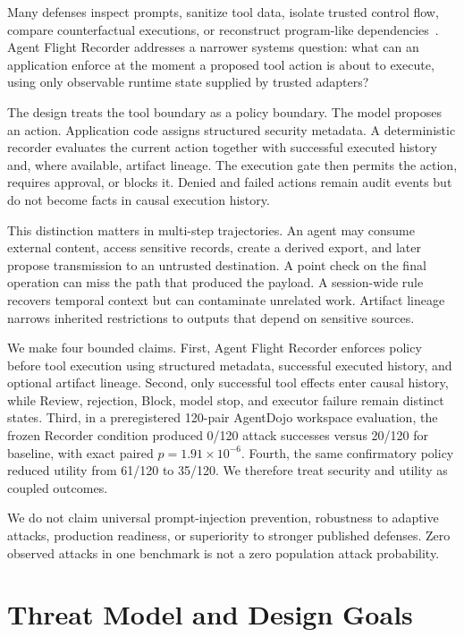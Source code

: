 \documentclass[letterpaper,twocolumn,10pt]{article}
\begin{document}
Many defenses inspect prompts, sanitize tool data, isolate trusted control flow, compare counterfactual executions, or reconstruct program-like dependencies~\cite{debenedetti2025camel,zhu2025melon,zhan2025adaptive,wang2025agentarmor,bhagwatkar2025firewalls,he2026attriguard,hofer2026automated}. Agent Flight Recorder addresses a narrower systems question: what can an application enforce at the moment a proposed tool action is about to execute, using only observable runtime state supplied by trusted adapters?

The design treats the tool boundary as a policy boundary. The model proposes an action. Application code assigns structured security metadata. A deterministic recorder evaluates the current action together with successful executed history and, where available, artifact lineage. The execution gate then permits the action, requires approval, or blocks it. Denied and failed actions remain audit events but do not become facts in causal execution history.

This distinction matters in multi-step trajectories. An agent may consume external content, access sensitive records, create a derived export, and later propose transmission to an untrusted destination. A point check on the final operation can miss the path that produced the payload. A session-wide rule recovers temporal context but can contaminate unrelated work. Artifact lineage narrows inherited restrictions to outputs that depend on sensitive sources.

We make four bounded claims. First, Agent Flight Recorder enforces policy before tool execution using structured metadata, successful executed history, and optional artifact lineage. Second, only successful tool effects enter causal history, while Review, rejection, Block, model stop, and executor failure remain distinct states. Third, in a preregistered 120-pair AgentDojo workspace evaluation, the frozen Recorder condition produced 0/120 attack successes versus 20/120 for baseline, with exact paired $p=1.91\times10^{-6}$. Fourth, the same confirmatory policy reduced utility from 61/120 to 35/120. We therefore treat security and utility as coupled outcomes.

We do not claim universal prompt-injection prevention, robustness to adaptive attacks, production readiness, or superiority to stronger published defenses. Zero observed attacks in one benchmark is not a zero population attack probability.

\section{Threat Model and Design Goals}
\end{document}
